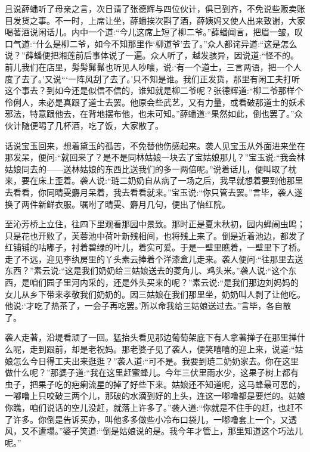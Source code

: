 \begin{parag}
    且说薛蟠听了母亲之言，次日请了张德辉与四位伙计，俱已到齐，不免说些贩卖账目发货之事。不一时，上席让坐，薛蟠挨次斟了酒，薛姨妈又使人出来致谢，大家喝著酒说闲话儿。内中一个道:“今儿这席上短了柳二爷。”薛蟠闻言，把眉一皱，叹口气道:“什么是柳二爷，如今不知那里作‘柳道爷’去了。”众人都诧异道:“这是怎么说？”薛蟠便把湘莲前后事体说了一遍。众人听了，越发骇异，因说道:“怪不的。前儿我们在店里，髣髣髴髴也听见人吵嚷，说:‘有一个道士，三言两语，把一个人度了去了。’又说“‘一阵风刮了去了。’只不知是谁。我们正发货，那里有闲工夫打听这个事去？到如今还是似信不信的，谁知就是柳二爷呢？张德辉道:“柳二爷那样个伶俐人，未必是真跟了道士去罢。他原会些武艺，又有力量，或看破那道士的妖术邪法，特意跟他去，在背地摆布他，也未可知。”薛蟠道:“果然如此，倒也罢了。”众伙计随便喝了几杯酒，吃了饭，大家散了。
\end{parag}


\begin{parag}
    话说宝玉回来，想着黛玉的孤苦，不免替他伤感起来。袭人见宝玉从外面进来坐在那发呆，便问:“就回来了？是不是同林姑娘一块去了宝姑娘那儿？”宝玉说:“我会林姑娘同去的——送林姑娘的东西比送我们的多一两倍呢。”说着话儿，便叫取了枕来，要在床上歪着。袭人说:“琏二奶奶自从病了一场之后，我早就想着要到他那里去看看，你同晴雯麝月呆着，我去看看就来。”宝玉说:“你只管去罢。”言毕，袭人遂换了两件新鲜衣服。嘱咐了晴雯、麝月几句，便出了怡红院。
\end{parag}


\begin{parag}
    至沁芳桥上立住，往四下里观看那园中景致。那时正是夏末秋初，园内蝉闹虫鸣；只是花也开败了，芙蓉池中荷叶新残相间，也将残上来了。倒是近着池边，都发了红铺铺的咕嘟子，衬着碧绿的叶儿，着实可爱。于是一壁里瞧着，一壁里下了桥。走了不远，迎见李纨房里的丫头素云捧着个洋漆盒儿走来。袭人便问:“往那里去送东西？”素云说:“这是我们奶奶给三姑娘送去的菱角儿、鸡头米。”袭人说:“这个东西，是咱们园子里河内采的，还是外头买来的呢？”素云说:“是我们那边刘妈妈的女儿从乡下带来孝敬我们奶奶的。因三姑娘在我们那里坐，奶奶叫人剥了让他吃。他说:‘才吃了热茶了，一会子再吃罢。’所以命我给三姑娘送过去。”言毕，各自散了。
\end{parag}


\begin{parag}
    袭人走著，沿堤看顽了一回。猛抬头看见那边葡萄架底下有人拿著掸子在那里掸什么呢，走到跟前，却是老祝妈。那老婆子见了袭人，便笑嘻嘻的迎上来，说道:“姑娘怎么今日得工夫出来逛逛？”袭人道:“可不是。我要到琏二奶奶家去。你在这里做什么呢？”那婆子道:“我在这里赶蜜蜂儿。今年三伏里雨水少，这果子树上都有虫子，把果子吃的疤瘌流星的掉了好些下来。姑娘还不知道呢，这马蜂最可恶的，一嘟噜上只咬破三两个儿，那破的水滴到好的上头，连这一嘟噜都是要烂的。姑娘你瞧，咱们说话的空儿没赶，就落上许多了。”袭人道:“你就是不住手的赶，也赶不了许多。你倒是告诉买办，叫他多多做些小冷布口袋儿，一嘟噜套上一个，又透风，又不遭塌。”婆子笑道:“倒是姑娘说的是。我今年才管上，那里知道这个巧法儿呢。”
\end{parag}


